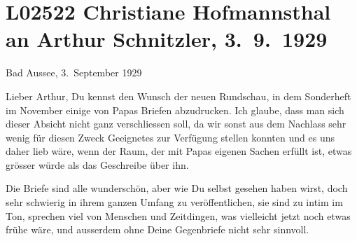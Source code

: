 

\section[Christiane Hofmannsthal an Arthur Schnitzler, 3. 9. 1929]{L02522 Christiane Hofmannsthal an Arthur Schnitzler, 3. 9. 1929}
\nopagebreak{}
\rehead{ }\normalsize\beginnumbering{}
\toendnotes[C]{\smallbreak\pagebreak[2]}
\toendnotes[C]{\smallbreak}
\pstart
           \raggedleft{}{\pb}Bad Aussee, 3. September 1929\pend
           
\pstart{}Lieber Arthur,\pend\vspace{0.5em}
\pstart
           Du kennst den Wunsch der neuen Rundschau, in dem
                  Sonderheft im November einige von Papas Briefen abzudrucken.
               Ich glaube, dass man sich dieser Absicht nicht ganz verschliessen soll, da wir sonst
               aus dem Nachlass sehr wenig für diesen Zweck Geeignetes zur Verfügung stellen konnten
               und es uns daher lieb wäre, wenn der Raum, der mit Papas eigenen Sachen erfüllt ist, etwas grösser würde als
               das Geschreibe über ihn.\pend
           
\pstart
           Die Briefe sind alle wunderschön, aber wie Du selbst gesehen haben wirst, doch sehr
               schwierig in ihrem ganzen Umfang zu veröffentlichen, sie sind zu intim im Ton,
               sprechen viel von Menschen und Zeitdingen, was vielleicht jetzt noch etwas frühe
               wäre, und ausserdem ohne Deine Gegenbriefe nicht sehr sinnvoll.\pend
           
